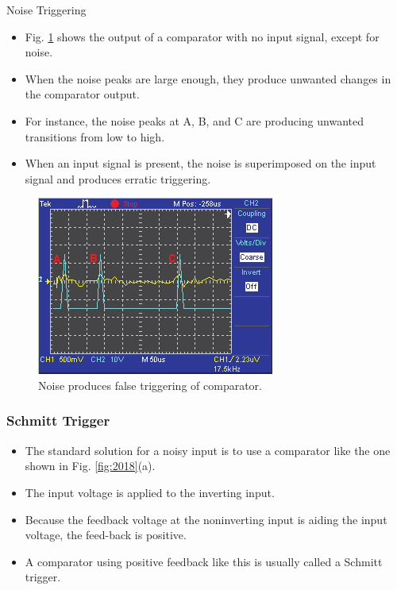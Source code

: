\documentclass[pdflatex,compress]{beamer}
\begin{document}
\begin{frame}{Noise Triggering}
	\begin{multicols}{2}
		\begin{itemize}
			\item Fig. \ref{fig:2017} shows the output of a comparator with no input signal, except for noise.
			\item When the noise peaks are large enough, they produce unwanted changes in the comparator output.
			\item For instance, the noise peaks at A, B, and C are producing unwanted transitions from low to high.
			\item When an input signal is present, the noise is superimposed on the input signal and produces erratic triggering.
		\end{itemize}
		\begin{figure}
			\centering
			\includegraphics[width=\linewidth]{img/2017}
			\caption{Noise produces false triggering of comparator.}
			\label{fig:2017}
		\end{figure}
	\end{multicols}
\end{frame}

\begin{frame}
	\frametitle{Schmitt Trigger}
	\begin{itemize}
		\item The standard solution for a noisy input is to use a comparator like the one shown in Fig. \ref{fig:2018}(a).
		\item The input voltage is applied to the inverting input.
		\item Because the feedback voltage at the noninverting input is aiding the input voltage, the feed-back is positive.
		\item A comparator using positive feedback like this is usually called a Schmitt trigger.
	\end{itemize}
\end{frame}
\end{document}
